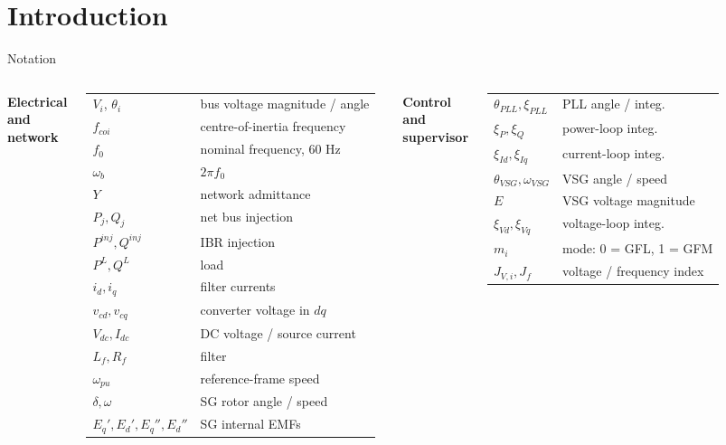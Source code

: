 \documentclass{beamer}
\begin{document}
\section{Introduction}
\begin{frame}{Notation}
\scriptsize
\renewcommand{\arraystretch}{1.12}\setlength{\tabcolsep}{3pt}
\begin{columns}[t,onlytextwidth]
\textbf{Electrical and network}\\[.05cm]
\begin{tabular}{@{}p{1.85cm}p{3.05cm}@{}}
$V_i$, $\theta_i$ & bus voltage magnitude / angle\\
$f_{coi}$ & centre-of-inertia frequency\\
$f_0$ & nominal frequency, 60 Hz\\
$\omega_b$ & $2\pi f_0$\\
$Y$ & network admittance\\
$P_j,Q_j$ & net bus injection\\
$P^{inj},Q^{inj}$ & IBR injection\\
$P^L,Q^L$ & load\\
$i_d,i_q$ & filter currents\\
$v_{cd},v_{cq}$ & converter voltage in $dq$\\
$V_{dc},I_{dc}$ & DC voltage / source current\\
$L_f,R_f$ & filter\\
$\omega_{pu}$ & reference-frame speed\\
$\delta,\omega$ & SG rotor angle / speed\\
$E_q',E_d',E_q'',E_d''$ & SG internal EMFs\\
\end{tabular}
\textbf{Control and supervisor}\\[.05cm]
\begin{tabular}{@{}p{1.85cm}p{3.05cm}@{}}
$\theta_{PLL},\xi_{PLL}$ & PLL angle / integ.\\
$\xi_P,\xi_Q$ & power-loop integ.\\
$\xi_{Id},\xi_{Iq}$ & current-loop integ.\\
$\theta_{VSG},\omega_{VSG}$ & VSG angle / speed\\
$E$ & VSG voltage magnitude\\
$\xi_{Vd},\xi_{Vq}$ & voltage-loop integ.\\
$m_i$ & mode: 0 = GFL, 1 = GFM\\
$J_{V,i},J_f$ & voltage / frequency index\\

\end{tabular}
\end{columns}
\end{frame}
\end{document}

